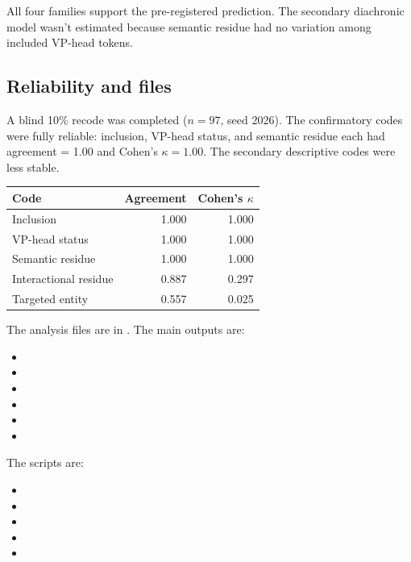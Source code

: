\documentclass[12pt]{article}
\begin{document}
All four families support the pre-registered prediction. The secondary
diachronic model wasn't estimated because semantic residue had no
variation among included VP-head tokens.

\subsection{Reliability and files}

A blind 10\% recode was completed ($n=97$, seed 2026). The
confirmatory codes were fully reliable: inclusion, VP-head status, and
semantic residue each had agreement = 1.00 and Cohen's $\kappa = 1.00$.
The secondary descriptive codes were less stable.

\begin{center}
\begin{tabular}{lrr}
  \toprule
  Code & Agreement & Cohen's $\kappa$ \\
  \midrule
  Inclusion & 1.000 & 1.000 \\
  VP-head status & 1.000 & 1.000 \\
  Semantic residue & 1.000 & 1.000 \\
  Interactional residue & 0.887 & 0.297 \\
  Targeted entity & 0.557 & 0.025 \\
  \bottomrule
\end{tabular}
\end{center}

The analysis files are in . The
main outputs are:

\begin{itemize}
  \item {}
  \item {}
  \item {}
  \item {}
  \item {}
  \item {}
\end{itemize}

The scripts are:

\begin{itemize}
  \item {}
  \item {}
  \item {}
  \item {}
  \item {}
\end{itemize}
\end{document}

